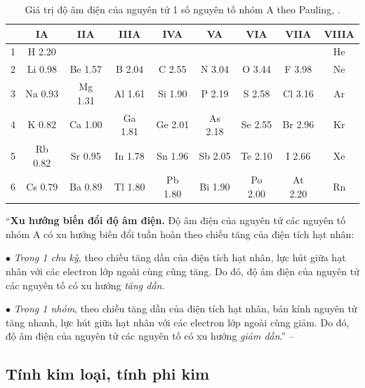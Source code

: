 \documentclass[oneside]{book}
\numberwithin{equation}{section}
\begin{document}
\begin{table}[H]
	\centering
	\begin{tabular}{|c|c|c|c|c|c|c|c|c|}
		\hline
		\diagbox{\textbf{Chu kỳ}}{\textbf{Nhóm}}& IA & IIA & IIIA & IVA & VA & VIA & VIIA & VIIIA \\
		\hline
		1 & H 2.20 &  &  &  &  &  &  & He \\
		\hline
		2 & Li 0.98 & Be 1.57 & B 2.04 & C 2.55 & N 3.04 & O 3.44 & F 3.98 & Ne \\
		\hline
		3 & Na 0.93 & Mg 1.31 & Al 1.61 & Si 1.90 & P 2.19 & S 2.58 & Cl 3.16 & Ar \\
		\hline
		4 & K 0.82 & Ca 1.00 & Ga 1.81 & Ge 2.01 & As 2.18 & Se 2.55 & Br 2.96 & Kr \\
		\hline
		5 & Rb 0.82 & Sr 0.95 & In 1.78 & Sn 1.96 & Sb 2.05 & Te 2.10 & I 2.66 & Xe \\
		\hline
		6 & Cs 0.79 & Ba 0.89 & Tl 1.80 & Pb 1.80 & Bi 1.90 & Po 2.00 & At 2.20 & Rn \\
		\hline
	\end{tabular}
	\caption{Giá trị độ âm điện của nguyên tử 1 số nguyên tố nhóm A theo Pauling, \cite[Bảng 6.1, p. 44]{SGK_Hoa_Hoc_10_Chan_Troi_Sang_Tao}.}
	\label{tab:gia tri do am dien cua nguyen tu 1 so nguyen to nhom A theo Pauling}
\end{table}
``\textbf{Xu hướng biến đổi độ âm điện.} Độ âm điện của nguyên tử các nguyên tố nhóm A có xu hướng biến đổi tuần hoàn theo chiều tăng của điện tích hạt nhân:
\begin{enumerate*}
	\item[$\bullet$] \textit{Trong 1 chu kỳ}, theo chiều tăng dần của điện tích hạt nhân, lực hút giữa hạt nhân với các electron lớp ngoài cùng cũng tăng. Do đó, độ âm điện của nguyên tử các nguyên tố có xu hướng \textit{tăng dần}.
	\item[$\bullet$] \textit{Trong 1 nhóm}, theo chiều tăng dần của điện tích hạt nhân, bán kính nguyên tử tăng nhanh, lực hút giữa hạt nhân với các electron lớp ngoài cùng giảm. Do đó, độ âm điện của nguyên tử các nguyên tố có xu hướng \textit{giảm dần}.'' -- \cite[p. 45]{SGK_Hoa_Hoc_10_Chan_Troi_Sang_Tao}
\end{enumerate*}

\subsection{Tính kim loại, tính phi kim}
\end{document}
